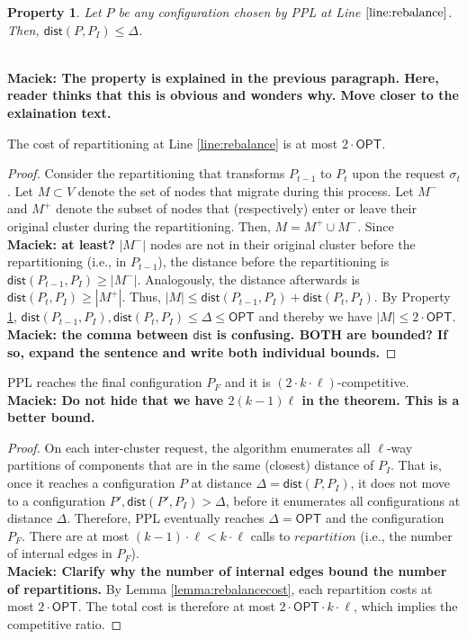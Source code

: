 \documentclass[manuscript,screen=true, review, anonymous]{acmart}
\newcommand{\OPT}{\textsf{OPT}\xspace}
\newcommand{\PPL}{\textsf{PPL}\xspace}
\newcommand{\dist}{\textsf{dist}}
\newtheorem{property}{Property}
\newcommand\mahmoud[1]{\color{orange}\textbf{\\ Mahmoud: #1}\\\color{black}}
\newcommand\maciek[1]{\color{brown}\textbf{\\ Maciek: #1}\color{black}}
\begin{document}
\begin{property} \label{prop:dist<OPT}
    Let $P$ be any configuration chosen by \PPL at Line $\ref{line:rebalance}$.
    Then, $\dist(P,P_I) \leq \Delta$.
\end{property}
\maciek{The property is explained in the previous paragraph. Here, reader thinks that this is obvious and wonders why. Move closer to the exlaination text.}

\begin{lemma}	\label{lemma:rebalancecost}
    The cost of repartitioning at Line \ref{line:rebalance} is at most $2\cdot\OPT$.
\end{lemma}
\begin{proof}
    Consider the repartitioning that transforms $P_{t-1}$ to $P_t$ upon the request $\sigma_t$.
    Let $M \subset V$ denote the set of nodes that migrate during this process.
	Let $M^-$ and $M^+$ denote the subset of nodes that (respectively)
    enter or leave their original cluster during the repartitioning.    
    Then,
    $M = M^+ \cup M^-$.
    Since \maciek{at least?} $|M^-|$ nodes are not in their original cluster before the repartitioning (i.e., in $P_{t-1}$),
    the distance before the repartitioning is $\dist(P_{t-1},P_I) \geq | M^-|$.
    Analogously,
     the distance afterwards is $\dist(P_{t},P_I) \geq | M^+|$.
    Thus,
    $|M| \leq \dist(P_{t-1},P_I) + \dist(P_{t},P_I)$.
    By Property \ref{prop:dist<OPT},
    $\dist(P_{t-1},P_I) , \dist(P_{t},P_I) \leq \Delta \leq \OPT$
    and thereby we have	
    $|M| \leq 2\cdot\OPT$.
    \maciek{the comma between $\dist$ is confusing. BOTH are bounded? If so, expand the sentence and write both individual bounds.}
\end{proof}

\begin{theorem}	\label{thm:upperbound}
    \PPL reaches the final configuration $P_F$ and it is $(2\cdot k\cdot\ell)$-competitive.
    \maciek{Do not hide that we have $2(k-1)\ell$ in the theorem. This is a better bound.}
\end{theorem}
\begin{proof}
      On each inter-cluster request,
     the algorithm enumerates all $\ell$-way partitions of components
     that are in the same (closest) distance of $P_I$.
     That is, 
     once it reaches a configuration $P$ at distance $\Delta = \dist(P, P_I)$,
     it does not move to a configuration
     $P', \dist(P', P_I) > \Delta$,
     before it enumerates all configurations at distance $\Delta$.
     Therefore,
     \PPL eventually reaches $\Delta=\OPT$ and the configuration $P_F$.
    There are at most $(k-1)\cdot\ell < k\cdot\ell $ calls   to $\mathit{repartition}$
     (i.e., the number of internal edges in $P_F$).
     \maciek{Clarify why the number of internal edges bound the number of repartitions.}
    By Lemma \ref{lemma:rebalancecost},
    each repartition costs at most $2\cdot\OPT$.
    The total cost is therefore at most $2\cdot\OPT\cdot k\cdot\ell$, which implies the competitive ratio.
 \end{proof}
\end{document}
